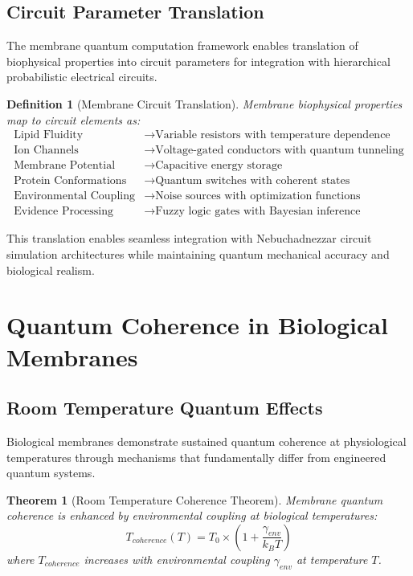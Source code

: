 \documentclass[12pt,a4paper]{article}
\newtheorem{theorem}{Theorem}
\newtheorem{definition}{Definition}
\begin{document}
\subsection{Circuit Parameter Translation}

The membrane quantum computation framework enables translation of biophysical properties into circuit parameters for integration with hierarchical probabilistic electrical circuits.

\begin{definition}[Membrane Circuit Translation]
Membrane biophysical properties map to circuit elements as:
\begin{align}
\text{Lipid Fluidity} &\rightarrow \text{Variable resistors with temperature dependence} \\
\text{Ion Channels} &\rightarrow \text{Voltage-gated conductors with quantum tunneling} \\
\text{Membrane Potential} &\rightarrow \text{Capacitive energy storage} \\
\text{Protein Conformations} &\rightarrow \text{Quantum switches with coherent states} \\
\text{Environmental Coupling} &\rightarrow \text{Noise sources with optimization functions} \\
\text{Evidence Processing} &\rightarrow \text{Fuzzy logic gates with Bayesian inference}
\end{align}
\end{definition}

This translation enables seamless integration with Nebuchadnezzar circuit simulation architectures while maintaining quantum mechanical accuracy and biological realism.

\section{Quantum Coherence in Biological Membranes}

\subsection{Room Temperature Quantum Effects}

Biological membranes demonstrate sustained quantum coherence at physiological temperatures through mechanisms that fundamentally differ from engineered quantum systems.

\begin{theorem}[Room Temperature Coherence Theorem]
Membrane quantum coherence is enhanced by environmental coupling at biological temperatures:
\begin{equation}
T_{coherence}(T) = T_0 \times \left(1 + \frac{\gamma_{env}}{k_B T}\right)
\end{equation}
where $T_{coherence}$ increases with environmental coupling $\gamma_{env}$ at temperature $T$.
\end{theorem}
\end{document}
